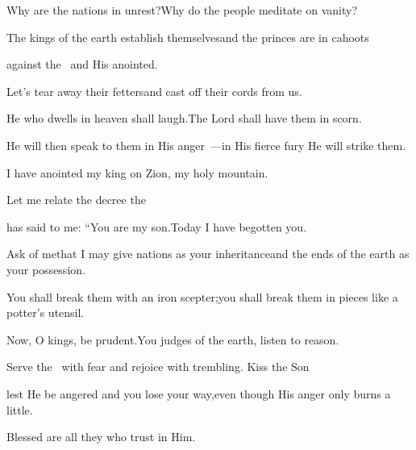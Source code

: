 
\begin{inparaenum}
  \pb{} Why are the nations in unrest?\pa{}Why do the people meditate on vanity?%

  \pb{} The kings of the earth establish themselves\pa{}and the princes are in cahoots%

  \pc{}against the \lord\ and His anointed.%

  \pb{} Let's tear away their fetters\pa{}and cast off their cords from us.%

  \pc{} He who dwells in heaven shall laugh.\pa{}The Lord%
  shall have them in scorn.%

  \pb{} He will then speak to them in His anger~---\pa{}in His fierce fury%
  He will strike them.%

  \pb{} I have anointed my king%
  \pa{}on Zion, my holy mountain.%

  \pc{} Let me relate the decree%
  the \lord%

  \pc{}has said to me: ``You are my son.\pa{}Today I have begotten you.%

  \pb{} Ask of me\pa{}that I may give nations as your inheritance\pa{}and the ends of the earth as your possession.%

  \pb{} You shall break them with an iron scepter;\pa{}you shall break them in pieces like a potter's utensil.%

  \pc{} Now, O kings, be prudent.\pa{}You judges of the earth, listen to reason.%

  \pc{} Serve the \lord\ with fear%
  \pa{}and rejoice with trembling.  Kiss the Son%

  \pc{}lest He be angered and you lose your way,\pa{}even though His anger only burns a little.%

  \pc{}Blessed are all they who trust in Him.%
\end{inparaenum}
